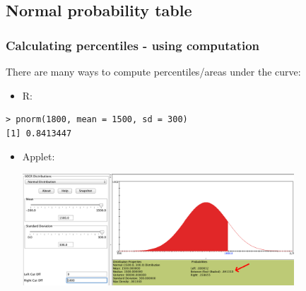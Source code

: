 
%
%
%
%
%
%

\subsection{Normal probability table}


\begin{frame}[fragile]
\frametitle{Calculating percentiles - using computation}

There are many ways to compute percentiles/areas under the curve:

\begin{itemize}
\item R:
\end{itemize}
\begin{beamerboxesrounded}[shadow = false, lower = code body]{}
{\small \begin{verbatim}
> pnorm(1800, mean = 1500, sd = 300)
[1] 0.8413447
\end{verbatim}
}
\end{beamerboxesrounded}
\begin{itemize}
\item Applet: {\small {}}
\begin{center}
\includegraphics[width=0.8\textwidth]{4-1_normal_distribution/figures/applet}
\end{center}

\end{itemize}


\end{frame}

